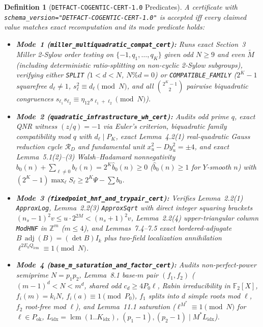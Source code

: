 \documentclass[10pt,twocolumn]{article}
\newtheorem{definition}{Definition}
\newcommand{\ZZ}{\mathbb{Z}}
\newcommand{\FF}{\mathbb{F}}
\begin{document}
{\begin{definition}[\texttt{DETFACT-COGENTIC-CERT-1.0} Predicates]\label{def:cert}
\normalfont A certificate with \texttt{schema\_\allowbreak version="DETFACT-\allowbreak COGENTIC-\allowbreak CERT-1.0"} is accepted iff every claimed value matches exact recomputation and its mode predicate holds:
\begin{itemize}[leftmargin=1.2em,itemsep=1pt,topsep=2pt]
  \item \textbf{Mode~1 (\texttt{miller\_\allowbreak multiquadratic\_\allowbreak compat\_\allowbreak cert}):} Runs exact Section~3 Miller 2-Sylow order testing on $\{-1, q_1,\dots,q_K\}$ given odd $N\ge 9$ and even $\tilde{M}$ (including deterministic ratio-splitting on non-cyclic 2-Sylow subgroups), verifying either \texttt{SPLIT} ($1<d<N$, $N\%d=0$) or \texttt{COMPATIBLE\_FAMILY} ($2^K-1$ squarefree $d_\ell\ne 1$, $s_\ell^2\equiv d_\ell\pmod N$, and all $\binom{2^K-1}{2}$ pairwise biquadratic congruences $s_{\ell_1}s_{\ell_2}\equiv\eta_{12}s_{\ell_1+\ell_2}\pmod N$).
  \item \textbf{Mode~2 (\texttt{quadratic\_\allowbreak infrastructure\_\allowbreak wh\_\allowbreak cert}):} Audits odd prime $q$, exact QNR witness $(z/q)=-1$ via Euler's criterion, biquadratic family compatibility mod $q$ with $d_\ell\mid P_K$, exact Lemma~4.2(1) real-quadratic Gauss reduction cycle $\mathcal{R}_D$ and fundamental unit $x_u^2 - D y_u^2 = \pm 4$, and exact Lemma~5.1(2)--(3) Walsh--Hadamard nonnegativity $b_0(n)+\sum_{\ell\ne 0}b_\ell(n) = 2^K\hat{b}_0(n)\ge 0$ ($\hat{b}_0(n)\ge 1$ for $Y$-smooth $n$) with $(2^K-1)\max_\ell S_\ell \ge 2^K\Psi - \sum b_0$.
  \item \textbf{Mode~3 (\texttt{fixedpoint\_\allowbreak hnf\_\allowbreak and\_\allowbreak trypair\_\allowbreak cert}):} Verifies Lemma~2.2(1) \texttt{ApproxLog}, Lemma~2.2(3) \texttt{ApproxSqrt} with direct integer squaring brackets $(n_s-1)^2 v \le u\cdot 2^{2M} < (n_s+1)^2 v$, Lemma~2.2(4) upper-triangular column \texttt{ModHNF} in $\ZZ^m$ ($m\le 4$), and Lemmas~7.4--7.5 exact bordered-adjugate $B\,\operatorname{adj}(B)=(\det B)I_k$ plus two-field localization annihilation $\ell^{2E_0 Q_{\mathrm{lcm}}}\equiv 1\pmod N$.
  \item \textbf{Mode~4 (\texttt{base\_\allowbreak m\_\allowbreak saturation\_\allowbreak and\_\allowbreak factor\_\allowbreak cert}):} Audits non-perfect-power semiprime $N=p_1 p_2$, Lemma~8.1 base-$m$ pair $(f_1,f_2)$ ($(m-1)^d<N<m^d$, shared odd $c_d\ge 4P_0\ell$, Rabin irreducibility in $\FF_2[X]$, $f_i(m)=k_i N$, $f_i(a)\equiv 1\pmod{P_0}$, $f_1$ splits into $d$ simple roots mod $\ell$, $f_2$ root-free mod $\ell$), and Lemma~11.1 saturation ($\ell^{M^*}\equiv 1\pmod N$ for $\ell\in P_{\mathrm{ok}}$, $L_{\mathrm{idx}}=\operatorname{lcm}(1..K_{\mathrm{idx}})$, $(p_1-1),(p_2-1)\mid M^* L_{\mathrm{idx}}$).
\end{itemize}
\end{definition}}
\end{document}
